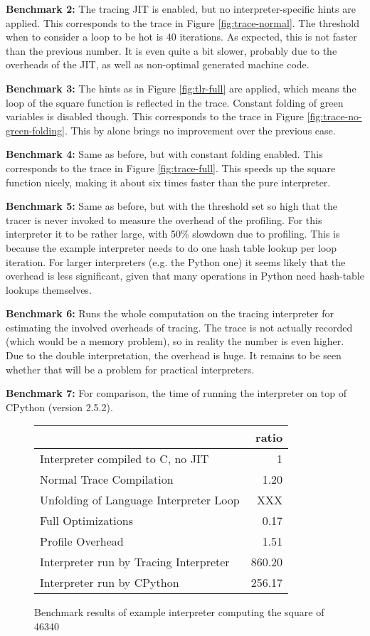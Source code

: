 \documentclass{acm_proc_article-sp}
\begin{document}
\textbf{Benchmark 2:} The tracing JIT is enabled, but no interpreter-specific
hints are applied. This corresponds to the trace in Figure
\ref{fig:trace-normal}.  The threshold when to consider a loop to be hot is 40
iterations.  As expected, this is not faster than the previous number. It is
even quite a bit slower, probably due to the overheads of the JIT, as well as
non-optimal generated machine code.

\textbf{Benchmark 3:} The hints as in Figure \ref{fig:tlr-full} are applied, which means the loop of
the square function is reflected in the trace. Constant folding of green
variables is disabled though. This corresponds to the trace in Figure
\ref{fig:trace-no-green-folding}. This by alone brings no improvement over the
previous case.

\textbf{Benchmark 4:} Same as before, but with constant folding enabled. This corresponds to the
trace in Figure \ref{fig:trace-full}. This speeds up the square function nicely,
making it about six times faster than the pure interpreter.

\textbf{Benchmark 5:} Same as before, but with the threshold set so high that the tracer is
never invoked to measure the overhead of the profiling. For this interpreter
it to be rather large, with 50\% slowdown due to profiling. This is
because the example interpreter needs to do one hash table lookup per loop
iteration. For larger interpreters (e.g. the Python one) it seems likely that
the overhead is less significant, given that many operations in Python need
hash-table lookups themselves.

\textbf{Benchmark 6:} Runs the whole computation on the tracing interpreter for estimating the
involved overheads of tracing. The trace is not actually recorded (which would be a
memory problem), so in reality the number is even higher. Due to the double
interpretation, the overhead is huge. It remains to be seen whether that will be
a problem for practical interpreters.

\textbf{Benchmark 7:} For comparison, the time of running the interpreter on top of CPython
(version 2.5.2).

\begin{figure}
\noindent
{\small
\begin{tabular}{|l|r|}
\hline
 &ratio\tabularnewline
\hline
Interpreter compiled to C, no JIT &1\tabularnewline \hline
Normal Trace Compilation &1.20\tabularnewline \hline
Unfolding of Language Interpreter Loop &XXX\tabularnewline \hline
Full Optimizations &0.17\tabularnewline \hline
Profile Overhead &1.51\tabularnewline \hline
Interpreter run by Tracing Interpreter &860.20\tabularnewline \hline
Interpreter run by CPython &256.17\tabularnewline \hline
\end{tabular}
}
\label{fig:bench1}
\caption{Benchmark results of example interpreter computing the square of
46340}
\end{figure}
\end{document}
